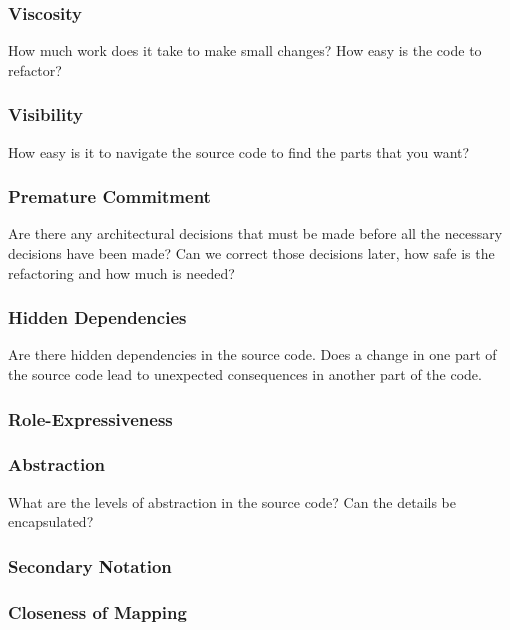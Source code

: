 \documentclass[12pt]{article}
\theoremstyle{definition}
\theoremstyle{theorem}
\begin{document}
\subsubsection{Viscosity}

How much work does it take to make small changes? How easy is the code to
refactor?

\subsubsection{Visibility}

How easy is it to navigate the source code to find the parts that you want?

\subsubsection{Premature Commitment}

Are there any architectural decisions that must be made before all the necessary
decisions have been made? Can we correct those decisions later, how safe is the
refactoring and how much is needed?

\subsubsection{Hidden Dependencies}

Are there hidden dependencies in the source code. Does a change in one part of
the source code lead to unexpected consequences in another part of the code.

\subsubsection{Role-Expressiveness}
\subsubsection{Abstraction}

What are the levels of abstraction in the source code? Can the details be
encapsulated?

\subsubsection{Secondary Notation}



\subsubsection{Closeness of Mapping}
\end{document}
